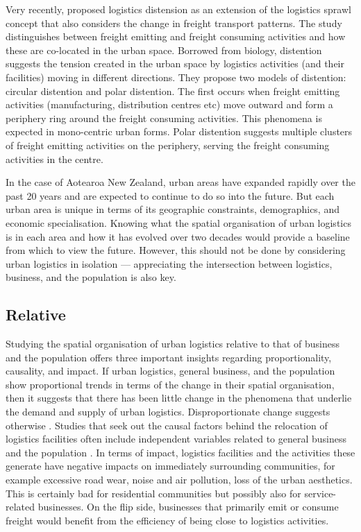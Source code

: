 \documentclass[3p, a4paper, authoryear, 11pt, fleqn, review]{elsarticle}
\newcommand{\nmt}[1]{{\color{ForestGreen}{~(nmt: #1)}}}
\begin{document}
 Very recently, \citet{Gardrat2021} proposed logistics distension as an extension of the logistics sprawl concept that also considers the change in freight transport patterns. The study distinguishes between freight emitting and freight consuming activities and how these are co-located in the urban space. Borrowed from biology, distention suggests the tension created in the urban space by logistics activities (and their facilities) moving in different directions. They propose two models of distention: circular distention and polar distention. The first occurs when freight emitting activities (manufacturing, distribution centres etc) move outward and form a periphery ring around the freight consuming activities. This phenomena is expected in mono-centric urban forms. Polar distention suggests multiple clusters of freight emitting activities on the periphery, serving the freight consuming activities in the centre.
 
In the case of Aotearoa New Zealand, urban areas have expanded rapidly over the past 20 years and are expected to continue to do so into the future. But each urban area is unique in terms of its geographic constraints, demographics, and economic specialisation. Knowing what the spatial organisation of urban logistics is in each area and how it has evolved over two decades would provide a baseline from which to view the future. However, this should not be done by considering urban logistics in isolation --- appreciating the intersection between logistics, business, and the population is also key. 


\subsection{Relative}

Studying the spatial organisation of urban logistics relative to that of business and the population offers three important insights regarding proportionality, causality, and impact. If urban logistics, general business, and the population show proportional trends in terms of the change in their spatial organisation, then it suggests that there has been little change in the phenomena \nmt{other word, but not factor} that underlie the demand and supply of urban logistics. Disproportionate change suggests otherwise \nmt{examples of studies}. Studies that seek out the causal factors behind the relocation of logistics facilities often include independent variables related to general business and the population \nmt{refs}. In terms of impact, logistics facilities and the activities these generate have negative impacts on immediately surrounding communities, for example excessive road wear, noise and air pollution, loss of the urban aesthetics. This is certainly bad for residential communities but possibly also for service-related businesses. On the flip side, businesses that primarily emit or consume freight would benefit from the efficiency of being close to logistics activities.  \nmt{Not sure about one long para here}
\end{document}
